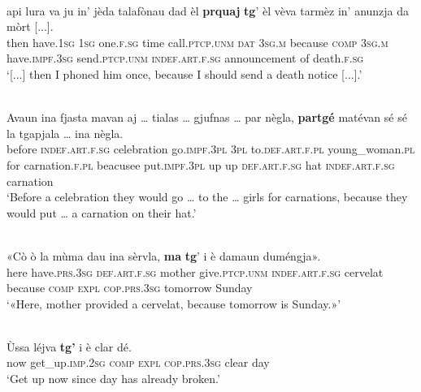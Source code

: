 \ea
\label{ex:caus3}
\\ 
\gll  [...] api lura va ju in’ jèda talafònau dad èl \textbf{prquaj} \textbf{tg}' èl vèva tarmèz in’ anunzja da mòrt [...].\\
then have.\textsc{1sg}  \textsc{1sg} one.\textsc{f.sg} time call.\textsc{ptcp.unm} \textsc{dat} \textsc{3sg.m} because \textsc{comp} \textsc{3sg.m} have.\textsc{impf.3sg} send.\textsc{ptcp.unm} \textsc{indef.art.f.sg} announcement of death.\textsc{f.sg}\\ 
\glt `[...] then I phoned him once, because I should send a death notice [...].'
\z

\ea
\label{ex:caus4}
\\ 
\gll    Avaun ina fjasta mavan aj … tialas … gjufnas … par nègla, \textbf{partgé} matévan sé sé la tgapjala … ina nègla.\\
before \textsc{indef.art.f.sg} celebration go.\textsc{impf.3pl} \textsc{3pl} {} to.\textsc{def.art.f.pl} {}  young\_woman.\textsc{pl} {} for carnation.\textsc{f.pl} beacusee put.\textsc{impf.3pl} up up  \textsc{def.art.f.sg} hat {} \textsc{indef.art.f.sg} carnation \\
\glt `Before a celebration they would go … to the … girls for carnations, because they would put … a carnation on their hat.'
\z

\ea
\label{ex:caus5}
\\ 
\gll «Cò ò la mùma dau ina sèrvla, \textbf{ma} \textbf{tg}’ i è damaun duméngja».\\
here have.\textsc{prs.3sg} \textsc{def.art.f.sg} mother give.\textsc{ptcp.unm} \textsc{indef.art.f.sg} cervelat because \textsc{comp} \textsc{expl} \textsc{cop.prs.3sg} tomorrow Sunday\\
\glt `«Here, mother provided a cervelat, because tomorrow is Sunday.»'
\z

\ea
\label{ex:caus6}
\\
\gll Ùssa léjva \textbf{tg'} i è clar dé.\\
  now get\_up.\textsc{imp.2sg} \textsc{comp} \textsc{expl} \textsc{cop.prs.3sg} clear day\\
\glt `Get up now since day has already broken.'
\z

